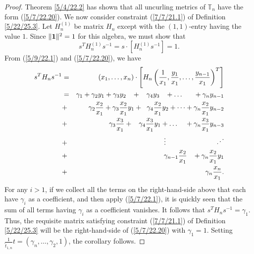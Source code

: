 \documentclass{amsart}
\theoremstyle{definition}
\numberwithin{theorem}{section}
\numberwithin{equation}{section}
\begin{document}
\begin{proof} Theorem \ref{5/4/22.2} has shown that all uncurling metrics of $\mathbb{T}_n$ have the form (\ref{5/7/22.20}).
We now consider constraint (\ref{7/7/21.1}) of Definition \ref{5/22/25.3}.  Let $H_n^{(1)}$ be matrix $H_n$ except with the  $(1,1)$-entry having the value $1$.  
Since $\|{\bf 1}\|^2 =1$ for this algebra, we must show that \[ s^T H_n^{(1)} s^{-1} = s\cdot [H_n^{(1)}s^{-1}] = 1.\] From (\ref{5/9/22.1}) and (\ref{5/7/22.20}), we have
\begin{eqnarray}\nonumber s^T H_n s^{-1} &=& (x_1,\dots,x_n)\cdot \left[ H_n \left(\frac{1}{x_1}, \frac{y_1}{x_1},\dots,\frac{y_{n-1}}{x_1}\right)^T\right] \\ 
 &=&  \gamma_1 + \gamma_2y_1 + \gamma_3y_2 \hspace{3mm} + \hspace{3mm}\gamma_4y_3 \hspace{3mm} + \dots   \hspace{6mm}+\gamma_ny_{n-1} \nonumber \\
&+&  \gamma_2 \frac{x_2}{x_1} + \gamma_3\frac{x_2}{x_1}y_1 + \hspace{2mm} \gamma_4\frac{x_2}{x_1}y_2 + \dots +  \gamma_n\frac{x_2}{x_1}y_{n-2} \nonumber \\ &+&\gamma_3 \frac{x_3}{x_1}  + \hspace{3mm}\gamma_4\frac{x_3}{x_1}y_1 +  \dots \hspace{4mm} +  \gamma_n\frac{x_3}{x_1}y_{n-3} \nonumber \\ 
&+&  \hspace{5mm} \vdots \hspace{2.5cm} \iddots \bigskip\bigskip \nonumber \\ &+& \gamma_{n-1} \frac{x_2}{x_1} \hspace{3mm} + \gamma_n \frac{x_2}{x_1}y_1 \nonumber \\ &+& \hspace{2mm} \gamma_n\frac{x_n}{x_1}. \label{6/23/22.1}
 \end{eqnarray}
 For any $i>1$, if we collect all the terms on the right-hand-side above that each have $\gamma_i$ as a coefficient, and then apply (\ref{5/7/22.1}), it is quickly seen that the sum of all terms having $\gamma_i$ as a coefficient vanishes.  It follows that
 $s^T H_n s^{-1} =\gamma_1$.   Thus, the requisite matrix satisfying constraint (\ref{7/7/21.1}) of Definition \ref{5/22/25.3} will be the right-hand-side of (\ref{5/7/22.20}) with $\gamma_1=1$.  Setting $\frac{1}{\hat{t}_{1,n}}t = (\gamma_n,\dots,\gamma_2, 1)$, the corollary follows.
\end{proof}
\end{document}
